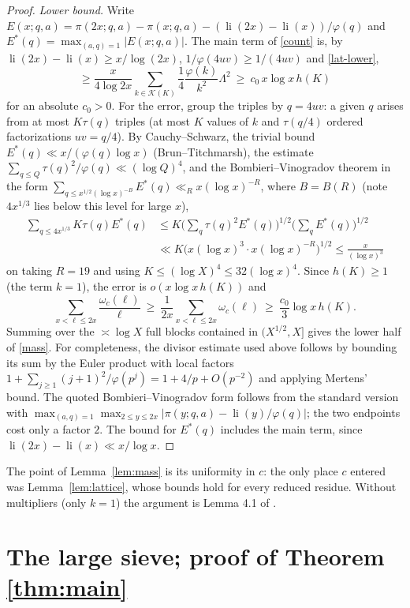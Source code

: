 \documentclass[11pt,reqno]{amsart}
\newcommand{\li}{\operatorname{li}}
\newcommand{\cK}{\mathcal K}
\begin{document}
\begin{proof}
\emph{Lower bound.}  Write
$E(x;q,a)=\pi(2x;q,a)-\pi(x;q,a)-(\li(2x)-\li(x))/\varphi(q)$ and
$E^*(q)=\max_{(a,q)=1}|E(x;q,a)|$.  The main term of \eqref{count} is, by
$\li(2x)-\li(x)\ge x/\log(2x)$, $1/\varphi(4uv)\ge1/(4uv)$ and \eqref{lat-lower},
\[
 \ge\frac{x}{4\log 2x}\sum_{k\in\cK(K)}\frac14\frac{\varphi(k)}{k^2}\Lambda^2
 \ \ge\ c_0\,x\log x\,h(K)
\]
for an absolute $c_0>0$.  For the error, group the triples by $q=4uv$: a given
$q$ arises from at most $K\tau(q)$ triples (at most $K$ values of $k$ and
$\tau(q/4)$ ordered factorizations $uv=q/4$).  By Cauchy--Schwarz, the trivial
bound $E^*(q)\ll x/(\varphi(q)\log x)$ (Brun--Titchmarsh), the estimate
$\sum_{q\le Q}\tau(q)^2/\varphi(q)\ll(\log Q)^4$, and the Bombieri--Vinogradov
theorem in the form $\sum_{q\le x^{1/2}(\log x)^{-B}}E^*(q)\ll_R x(\log x)^{-R}$,
where $B=B(R)$ (note $4x^{1/3}$ lies below this level for large $x$),
\[
\begin{aligned}
 \sum_{q\le4x^{1/3}}K\tau(q)E^*(q)
 &\le K\Big(\sum_q\tau(q)^2E^*(q)\Big)^{1/2}\Big(\sum_qE^*(q)\Big)^{1/2}\\
 &\ll K\big(x(\log x)^3\cdot x(\log x)^{-R}\big)^{1/2}
 \le\frac{x}{(\log x)^{3}}
\end{aligned}
\]
on taking $R=19$ and using $K\le(\log X)^4\le 32(\log x)^4$.  Since
$h(K)\ge1$ (the term $k=1$), the error is $o(x\log x\,h(K))$ and
\[
 \sum_{x<\ell\le2x}\frac{\omega_c(\ell)}{\ell}\ \ge\ \frac1{2x}\sum_{x<\ell\le2x}\omega_c(\ell)\ \ge\ \frac{c_0}{3}\log x\,h(K).
\]
Summing over the $\asymp\log X$ full blocks contained in $(X^{1/2},X]$
gives the lower half of \eqref{mass}.
For completeness, the divisor estimate used above follows by bounding its
sum by the Euler product with local factors
$1+\sum_{j\ge1}(j+1)^2/\varphi(p^j)=1+4/p+O(p^{-2})$ and applying Mertens' bound.
The quoted Bombieri--Vinogradov form follows from the standard version with
$\max_{(a,q)=1}\max_{2\le y\le2x}|\pi(y;q,a)-\li(y)/\varphi(q)|$;
the two endpoints cost only a factor $2$.  The bound for $E^*(q)$ includes
the main term, since $\li(2x)-\li(x)\ll x/\log x$.
\end{proof}

The point of Lemma~\ref{lem:mass} is its uniformity in $c$: the only place
$c$ entered was Lemma~\ref{lem:lattice}, whose bounds hold for every reduced
residue.  Without multipliers (only $k=1$) the argument is Lemma 4.1 of \cite{PW}.

\section{The large sieve; proof of Theorem \ref{thm:main}}\label{sec:sieve}
\end{document}
